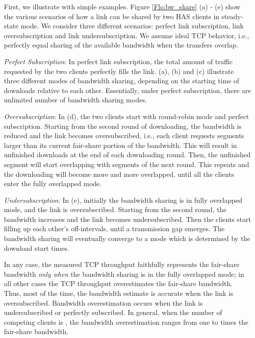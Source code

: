 \documentclass[conference]{IEEEtran}
\theoremstyle{plain}
\theoremstyle{definition}
\theoremstyle{plain}
\theoremstyle{plain}
\begin{document}
First, we illustrate with simple examples. Figure \ref{Flo:bw_share}
(a) - (e) show the various scenarios of how a link can be shared by
two HAS clients in steady-state mode. We consider three different
scenarios: perfect link subscription, link oversubscription and link
undersubscription. We assume ideal TCP behavior, i.e., perfectly equal
sharing of the available bandwidth when the transfers overlap.

\emph{Perfect Subscription}: In perfect link subscription, the total
amount of traffic requested by the two clients perfectly fills the
link. (a), (b) and (c) illustrate three different modes of bandwidth
sharing, depending on the starting time of downloads relative to each
other. Essentially, under perfect subscription, there are unlimited
number of bandwidth sharing modes.

\emph{Oversubscription}: In (d), the two clients start with round-robin
mode and perfect subscription. Starting from the second round of downloading,
the bandwidth is reduced and the link becomes oversubscribed, i.e.,
each client requests segments larger than its current fair-share portion
of the bandwidth. This will result in unfinished downloads at the
end of each downloading round. Then, the unfinished segment will start
overlapping with segments of the next round. This repeats and the
downloading will become more and more overlapped, until all the clients
enter the fully overlapped mode.

\emph{Undersubscription}: In (e), initially the bandwidth sharing
is in fully overlapped mode, and the link is oversubscribed. Starting
from the second round, the bandwidth increases and the link becomes
undersubscribed. Then the clients start filling up each other's off-intervals,
until a transmission gap emerges. The bandwidth sharing will eventually
converge to a mode which is determined by the download start times. 

In any case, the measured TCP throughput faithfully represents the
fair-share bandwidth \emph{only when} the bandwidth sharing is in
the fully overlapped mode; in all other cases the TCP throughput overestimates
the fair-share bandwidth. Thus, most of the time, the bandwidth estimate
is accurate when the link is oversubscribed. Bandwidth overestimation
occurs when the link is undersubscribed or perfectly subscribed. In
general, when the number of competing clients is , the bandwidth
overestimation ranges from one to  times the fair-share bandwidth.
\end{document}

